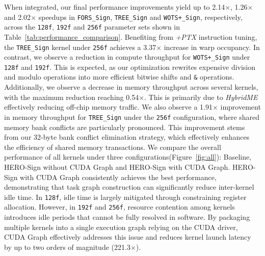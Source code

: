 \documentclass[10pt,conference]{IEEEtran}
\begin{document}
When integrated, our final performance improvements yield up to 2.14$\times$, 1.26$\times$ and 2.02$\times$ speedups in \texttt{FORS\_Sign}, \texttt{TREE\_Sign} and \texttt{WOTS+\_Sign}, respectively, across the \texttt{128f}, \texttt{192f} and \texttt{256f} parameter sets shown in Table~\ref{tab:performance_comparison}. Benefiting from \textit{+PTX} instruction tuning, the \texttt{TREE\_Sign} kernel under \texttt{256f} achieves a 3.37$\times$ increase in warp occupancy. In contrast, we observe a reduction in compute throughput for \texttt{WOTS+\_Sign} under \texttt{128f} and \texttt{192f}. This is expected, as our optimization rewrites expensive division and modulo operations into more efficient bitwise shifts and \texttt{\&} operations. Additionally, we observe a decrease in memory throughput across several kernels, with the maximum reduction reaching 0.54$\times$. This is primarily due to \textit{HybridME} effectively reducing off-chip memory traffic. We also observe a 1.91$\times$ improvement in memory throughput for \texttt{TREE\_Sign} under the \texttt{256f} configuration, where shared memory bank conflicts are particularly pronounced. This improvement stems from our 32-byte bank conflict elimination strategy, which effectively enhances the efficiency of shared memory transactions. We compare the overall performance of all kernels under three configurations(Figure~\ref{fig:all}): Baseline, HERO-Sign without CUDA Graph and HERO-Sign with CUDA Graph. HERO-Sign with CUDA Graph consistently achieves the best performance, demonstrating that task graph construction can significantly reduce inter-kernel idle time. In \texttt{128f}, idle time is largely mitigated through constraining register allocation. However, in \texttt{192f} and \texttt{256f}, resource contention among kernels introduces idle periods that cannot be fully resolved in software. By packaging multiple kernels into a single execution graph relying on the CUDA driver, CUDA Graph effectively addresses this issue and reduces kernel launch latency by up to two orders of magnitude (221.3$\times$).
\end{document}
